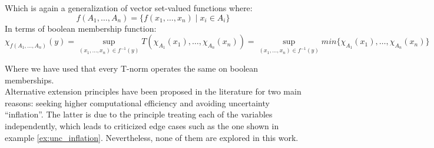 Which is again a generalization of vector set-valued functions where: $$f(A_1,\ldots,A_n)= \{f(x_1,\ldots,x_n)\mid x_i\in A_i\}$$
In terms of boolean membership function:
$$\chi _{f(A_1,\ldots,A_n)}(y)=\sup_{(x_1,\ldots,x_n)\in f^{-1}(y)}T(\chi_{A_1}(x_1),\ldots,\chi_{A_n}(x_n)) = \sup_{(x_1,\ldots,x_n)\in f^{-1}(y)}min\{\chi_{A_1}(x_1),\ldots,\chi_{A_n}(x_n)\}$$

Where we have used that every T-norm operates the same on boolean memberships.\\

Alternative extension principles have been proposed in the literature for two main reasons: seeking higher computational efficiency and avoiding uncertainty ``inflation''. The latter is due to the principle treating each of the variables independently, which leads to criticized edge cases such as the one shown in example \ref{ex:unc_inflation}. Nevertheless, none of them are explored in this work.